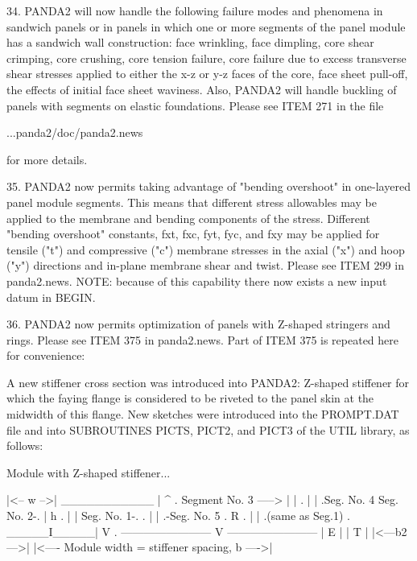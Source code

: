 34. PANDA2 will now handle the following failure modes and phenomena in
sandwich panels or in panels in which one or more segments of the panel
module has a sandwich wall construction: face wrinkling, face dimpling,
core shear crimping, core crushing, core tension failure, core failure due
to excess transverse shear stresses applied to either the x-z or y-z faces
of the core, face sheet pull-off, the effects of initial face sheet
waviness. Also, PANDA2 will handle buckling of panels with segments on
elastic foundations. Please see ITEM 271 in the file 

         ...panda2/doc/panda2.news

for more details. 

35. PANDA2 now permits taking advantage of "bending overshoot" in
one-layered panel module segments. This means that different stress
allowables may be applied to the membrane and bending components of
the stress. Different "bending overshoot" constants, fxt, fxc, fyt,
fyc, and fxy may be applied for tensile ("t") and compressive ("c")
membrane stresses in the axial ("x") and hoop ("y") directions and
in-plane membrane shear and twist. Please see ITEM 299 in panda2.news.
NOTE: because of this capability there now exists a new input datum
in BEGIN.

36. PANDA2 now permits optimization of panels with Z-shaped stringers
and rings. Please see ITEM 375 in panda2.news. Part of ITEM 375 is
repeated here for convenience:

A new stiffener cross section was introduced into PANDA2: Z-shaped
stiffener for which the faying flange is considered to be riveted to the
panel skin at the midwidth of this flange. New sketches were introduced
into the PROMPT.DAT file and into SUBROUTINES PICTS, PICT2, and PICT3 of
the UTIL library, as follows: 

       Module with Z-shaped stiffener...

                                     |<-- w -->|
                                     ___________
                                     |   ^    .
                Segment No. 3 -----> |   |     .
                                     |   |      .Seg. No. 4
                    Seg. No. 2-.     |   h
                                .    |   |
              Seg. No. 1-.       .   |   |          .-Seg. No. 5
                        .      R  .  |   |         .(same as Seg.1)
                       .  _____I_____|   V        .
      ------------------------ V ------------------------
                          |    E     |
                          |    T     |
                          |<---b2--->|
      |<---- Module width  =  stiffener spacing, b ---->|


